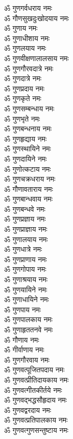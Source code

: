 \begin{multicols}{2}
\begin{flushleft}
ॐ गुणगर्वधराय नमः\\
ॐ गौणसुखदुःखोदयाय नमः\\
ॐ गुणाय नमः\hfill{}\\
ॐ गुणाधीशाय नमः\\
ॐ गुणलयाय नमः\\
ॐ गुणवीक्षणालालसाय नमः\\
ॐ गुणगौरवदात्रे नमः\\
ॐ गुणदात्रे नमः\\
ॐ गुणप्रदाय नमः\\
ॐ गुणकृते नमः\\
ॐ गुणसम्बन्धाय नमः\\
ॐ गुणभृते नमः\\
ॐ गुणबन्धनाय नमः\hfill{}\\
ॐ गुणहृद्याय नमः\\
ॐ गुणस्थायिने नमः\\
ॐ गुणदायिने नमः\\
ॐ गुणोत्कटाय नमः\\
ॐ गुणचक्रधराय नमः\\
ॐ गौणावताराय नमः\\
ॐ गुणबान्धवाय नमः\\
ॐ गुणबन्धवे नमः\\
ॐ गुणप्रज्ञाय नमः\\
ॐ गुणप्राज्ञाय नमः\hfill{}\\
ॐ गुणालयाय नमः\\
ॐ गुणधात्रे नमः\\
ॐ गुणप्राणाय नमः\\
ॐ गुणगोपाय नमः\\
ॐ गुणाश्रयाय नमः\\
ॐ गुणयायिने नमः\\
ॐ गुणाधायिने नमः\\
ॐ गुणपाय नमः\\
ॐ गुणपालकाय नमः\\
ॐ गुणाहृततनवे नमः\hfill{}\\
ॐ गौणाय नमः\\
ॐ गीर्वाणाय नमः\\
ॐ गुणगौरवाय नमः\\
ॐ गुणवत्पूजितपदाय नमः\\
ॐ गुणवत्प्रीतिदायकाय नमः\\
ॐ गुणवत्गीतकीर्तये नमः\\
ॐ गुणवद्भद्धसौहृदाय नमः\\
ॐ गुणवद्वरदाय नमः\\
ॐ गुणवत्प्रतिपालकाय नमः\\
ॐ गुणवत्गुणसन्तुष्टाय नमः\hfill{}\\

\end{flushleft}
\end{multicols}
